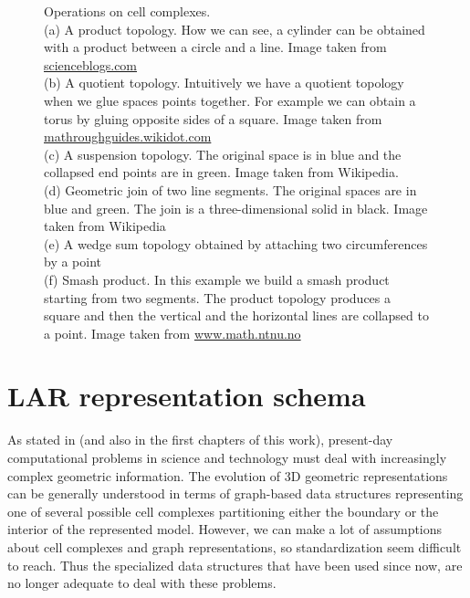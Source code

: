 \begin{figure}[htbp]
   \caption[Operations on cell complexes]{Operations on cell complexes.\\ (a) A product topology. How we can see, a cylinder can be obtained with a product between a circle and a line. Image taken from \href{http://scienceblogs.com/goodmath/2006/09/21/topological-products/}{scienceblogs.com}\\ (b) A quotient topology. Intuitively we have a quotient topology when we glue spaces points together. For example we can obtain a torus by gluing opposite sides of a square. Image taken from \href{http://mathroughguides.wikidot.com/article:point-set-topology}{mathroughguides.wikidot.com}\\ (c) A suspension topology. The original space is in blue and the collapsed end points are in green. Image taken from Wikipedia.\\ (d) Geometric join of two line segments. The original spaces are in blue and green. The join is a three-dimensional solid in black. Image taken from Wikipedia\\ (e) A wedge sum topology obtained by attaching two circumferences by a point\\ (f) Smash product. In this example we build a smash product starting from two segments. The product topology produces a square and then the vertical and the horizontal lines are collapsed to a point. Image taken from \href{http://www.math.ntnu.no/~stacey/Seminars/chern.html}{www.math.ntnu.no}}
   \label{fig:cellOperations}
\end{figure}

\section{LAR representation schema}\label{sec21:LAR}

As stated in \cite{DiCarlo} (and also in the first chapters of this work), present-day computational problems in science and technology must deal with increasingly complex geometric information. The evolution of 3D geometric representations can be generally understood in terms of graph-based data structures representing one of several possible cell complexes partitioning either the boundary or the interior of the represented model. However, we can make a lot of assumptions about cell complexes and graph representations, so standardization seem difficult to reach. Thus the specialized data structures that have been used since now, are no longer adequate to deal with these problems.\\

